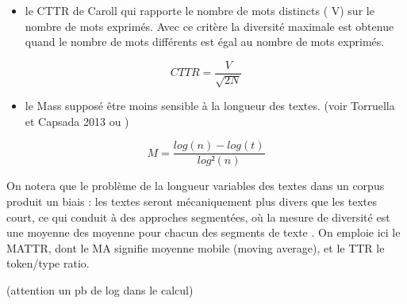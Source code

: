 \documentclass[
  letterpaper,
  DIV=11,
  numbers=noendperiod]{scrreprt}
\newenvironment{Shaded}{\begin{snugshade}}{\end{snugshade}}
\newcommand{\AttributeTok}[1]{\textcolor[rgb]{0.40,0.45,0.13}{#1}}
\newcommand{\CommentTok}[1]{\textcolor[rgb]{0.37,0.37,0.37}{#1}}
\newcommand{\ConstantTok}[1]{\textcolor[rgb]{0.56,0.35,0.01}{#1}}
\newcommand{\DecValTok}[1]{\textcolor[rgb]{0.68,0.00,0.00}{#1}}
\newcommand{\FunctionTok}[1]{\textcolor[rgb]{0.28,0.35,0.67}{#1}}
\newcommand{\NormalTok}[1]{\textcolor[rgb]{0.00,0.23,0.31}{#1}}
\newcommand{\OtherTok}[1]{\textcolor[rgb]{0.00,0.23,0.31}{#1}}
\newcommand{\SpecialCharTok}[1]{\textcolor[rgb]{0.37,0.37,0.37}{#1}}
\newcommand{\StringTok}[1]{\textcolor[rgb]{0.13,0.47,0.30}{#1}}
\providecommand{\tightlist}{%
  \setlength{\itemsep}{0pt}\setlength{\parskip}{0pt}}\usepackage{longtable,booktabs,array}
\begin{document}
\begin{itemize}
\tightlist
\item
  le CTTR de Caroll qui rapporte le nombre de mots distincts ( V) sur le
  nombre de mots exprimés. Avec ce critère la diversité maximale est
  obtenue quand le nombre de mots différents est égal au nombre de mots
  exprimés.
\end{itemize}

\[
CTTR = \frac{V}{\sqrt{2N}}
\]

\begin{itemize}
\tightlist
\item
  le Mass supposé être moins sensible à la longueur des textes. (voir
  Torruella et Capsada 2013 ou )
\end{itemize}

\[
M = \frac{log(n) - log(t)}{log² (n)}
\]

On notera que le problème de la longueur variables des textes dans un
corpus produit un biais : les textes seront mécaniquement plus divers
que les textes court, ce qui conduit à des approches segmentées, où la
mesure de diversité est une moyenne des moyenne pour chacun des segments
de texte . On emploie ici le MATTR, dont le MA signifie moyenne mobile
(moving average), et le TTR le token/type ratio.

(attention un pb de log dans le calcul)

\begin{Shaded}
\end{Shaded}
\end{document}
